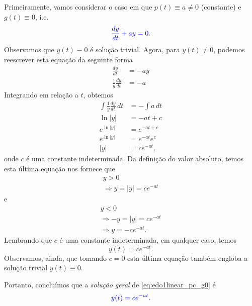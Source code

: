 Primeiramente, vamos considerar o caso em que $p(t) \equiv a \neq 0$ (constante) e $g(t) \equiv 0$, i.e.
\begin{equation}\label{eq:edo1linear_pc_g0}
  \color{blue}{\frac{dy}{dt} + ay = 0.}
\end{equation}
Observamos que $y(t)\equiv 0$ é solução trivial. Agora, para $y(t)\neq 0$, podemos reescrever esta equação da seguinte forma
\begin{align}
  \frac{dy}{dt} &= -ay \\
  \frac{1}{y}\frac{dy}{dt} &= -a
\end{align}
Integrando em relação a $t$, obtemos
\begin{align}
  \int \frac{1}{y}\frac{dy}{dt}\,dt &= -\int a\,dt \\
  \ln|y| &= -at + c \\
  e^{\ln|y|} &= e^{-at + c} \\
  e^{\ln|y|} &= e^{-at}e^c \\
  |y| &= ce^{-at},
\end{align}
onde $c$ é uma constante indeterminada. Da definição do valor absoluto, temos esta última equação nos fornece que
\begin{gather}
  y>0 \\
  \Rightarrow y = |y| = ce^{-at}
\end{gather}
e
\begin{gather}
  y<0 \\
  \Rightarrow -y = |y| = ce^{-at}\\
  \Rightarrow y=-ce^{-at}.
\end{gather}
Lembrando que $c$ é uma constante indeterminada, em qualquer caso, temos
\begin{equation}
  y(t) = ce^{-at}.
\end{equation}
Observamos, ainda, que tomando $c=0$ esta última equação também engloba a solução trivial $y(t)\equiv 0$.

Portanto, concluímos que a \emph{solução geral} de \eqref{eq:edo1linear_pc_g0} é
\begin{equation}
  \color{blue}{y(t) = ce^{-at}.}
\end{equation}

